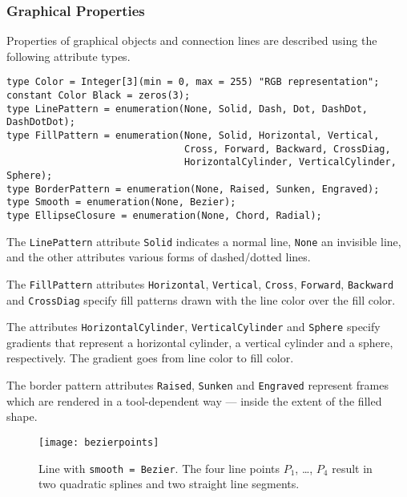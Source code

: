 \subsubsection{Graphical Properties}\label{graphical-properties}

Properties of graphical objects and connection lines are described using the following attribute types.
\begin{lstlisting}[language=modelica]
type Color = Integer[3](min = 0, max = 255) "RGB representation";
constant Color Black = zeros(3);
type LinePattern = enumeration(None, Solid, Dash, Dot, DashDot, DashDotDot);
type FillPattern = enumeration(None, Solid, Horizontal, Vertical,
                               Cross, Forward, Backward, CrossDiag,
                               HorizontalCylinder, VerticalCylinder, Sphere);
type BorderPattern = enumeration(None, Raised, Sunken, Engraved);
type Smooth = enumeration(None, Bezier);
type EllipseClosure = enumeration(None, Chord, Radial);
\end{lstlisting}%
The \lstinline!LinePattern! attribute \lstinline!Solid! indicates a normal line, \lstinline!None! an invisible line, and the other attributes various forms of dashed/dotted lines.

The \lstinline!FillPattern! attributes \lstinline!Horizontal!, \lstinline!Vertical!, \lstinline!Cross!, \lstinline!Forward!, \lstinline!Backward! and \lstinline!CrossDiag! specify fill patterns drawn with the line color over the fill color.

The attributes \lstinline!HorizontalCylinder!, \lstinline!VerticalCylinder! and \lstinline!Sphere! specify
gradients that represent a horizontal cylinder, a vertical cylinder and
a sphere, respectively. The gradient goes from line color to fill color.

The border pattern attributes \lstinline!Raised!, \lstinline!Sunken! and \lstinline!Engraved! represent frames which are rendered in a tool-dependent way --- inside the extent of the filled shape.

\begin{figure}[H]
  \begin{center}
    \texttt{[image: bezierpoints]}
  \end{center}
  \caption{Line with \lstinline!smooth = Bezier!.  The four line points $P_{1}$, \ldots{}, $P_{4}$ result in two quadratic splines and two straight line segments.}\label{fig:smooth-bezier}
\end{figure}

